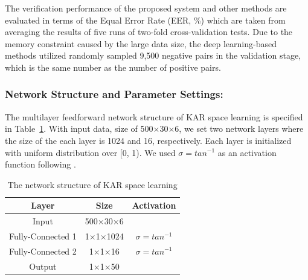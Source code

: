 \documentclass[sigconf]{acmart}
\begin{document}
The verification performance of the proposed system and other methods are evaluated in terms of the Equal Error Rate (EER, \%) which are taken from averaging the results of five runs of two-fold cross-validation tests. Due to the memory constraint caused by the large data size, the deep learning-based methods utilized randomly sampled 9,500 negative pairs in the validation stage, which is the same number as the number of positive pairs.

\subsubsection{Network Structure and Parameter Settings:}
The multilayer feedforward network structure of KAR space learning is specified in Table~\ref{tab2}. With input data, size of 500$\times$30$\times$6, we set two network layers where the size of the each layer is 1024 and 16, respectively. Each layer is initialized with uniform distribution over [0, 1). We used $\sigma = {tan}^{-1}$ as an activation function following \cite{toh2018analytic}.
\begin{table}
    \caption{The network structure of KAR space learning}
    \label{tab2}
    \begin{tabular}{ccc}
     \toprule
     Layer   & Size     & Activation \\
     \midrule
     Input   & 500$\times$30$\times$6 &            \\
     Fully-Connected 1 & 1$\times$1$\times$1024 & $\sigma = {tan}^{-1}$     \\
     Fully-Connected 2 & 1$\times$1$\times$16  & $\sigma = {tan}^{-1}$     \\
     Output  & 1$\times$1$\times$50   &            \\
     \bottomrule
    \end{tabular}
\end{table}
\end{document}
